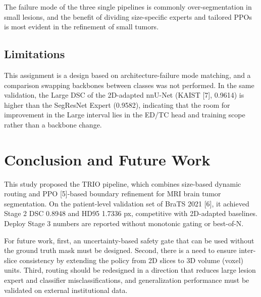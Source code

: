 \documentclass[11pt,a4paper]{article}
\begin{document}
The failure mode of the three single pipelines is commonly over-segmentation in small lesions, and the benefit of dividing size-specific experts and tailored PPOs is most evident in the refinement of small tumors.

\subsection{Limitations}
This assignment is a design based on architecture-failure mode matching, and a comparison swapping backbones between classes was not performed. In the same validation, the Large DSC of the 2D-adapted nnU-Net (KAIST [7], 0.9614) is higher than the SegResNet Expert (0.9582), indicating that the room for improvement in the Large interval lies in the ED/TC head and training scope rather than a backbone change.

\section{Conclusion and Future Work}
This study proposed the TRIO pipeline, which combines size-based dynamic routing and PPO [5]-based boundary refinement for MRI brain tumor segmentation. On the patient-level validation set of BraTS 2021 [6], it achieved Stage 2 DSC 0.8948 and HD95 1.7336 px, competitive with 2D-adapted baselines. Deploy Stage 3 numbers are reported without monotonic gating or best-of-N.

For future work, first, an uncertainty-based safety gate that can be used without the ground truth mask must be designed. Second, there is a need to ensure inter-slice consistency by extending the policy from 2D slices to 3D volume (voxel) units. Third, routing should be redesigned in a direction that reduces large lesion expert and classifier misclassifications, and generalization performance must be validated on external institutional data.
\end{document}
